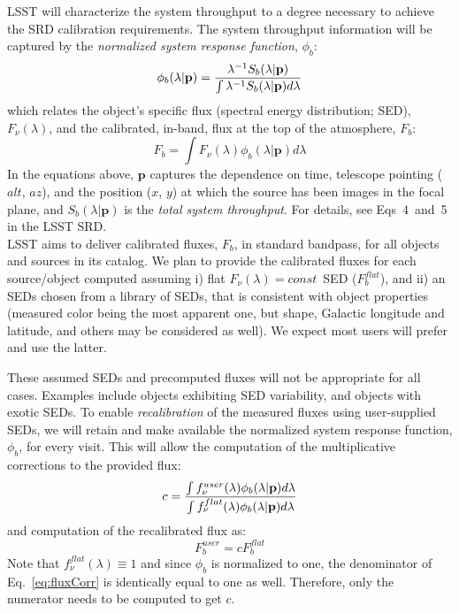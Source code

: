 \documentclass[12pt,preprint]{aastex}
\begin{document}
LSST will characterize the system throughput to a degree necessary to achieve the SRD calibration requirements. The system throughput information will be captured by the {\em normalized system response function}, $\phi_b$:
%
\begin{equation}
    \phi_b(\lambda|\mathbf{p}) = {\lambda^{-1} S_b(\lambda|\mathbf{p}) \over \int \lambda^{-1} S_b(\lambda|\mathbf{p}) d\lambda}
\end{equation}
%
which relates the object's specific flux (spectral energy distribution; SED), $F_\nu(\lambda)$, and the calibrated, in-band, flux at the top of the atmosphere, $F_b$:
%
\begin{equation}
    F_b = \int F_\nu(\lambda) \phi_b(\lambda|\mathbf{p}) d\lambda
\end{equation}
In the equations above, $\mathbf{p}$ captures the dependence on time, telescope pointing ($alt$, $az$), and the position ($x$, $y$) at which the source has been images in the focal plane, and $S_b(\lambda|\mathbf{p})$ is the {\em total system throughput}. For details, see Eqs~4~and~5 in the LSST SRD.
\\

LSST aims to deliver calibrated fluxes, $F_b$, in standard bandpass, for all objects and sources in its catalog. We plan to provide the calibrated fluxes for each source/object computed assuming i) flat $F_\nu(\lambda) = const\,$ SED ($F_b^{flat}$), and ii) an SEDs chosen from a library of SEDs, that is consistent with object properties (measured color being the most apparent one, but shape, Galactic longitude and latitude, and others may be considered as well). We expect most users will prefer and use the latter.

These assumed SEDs and precomputed fluxes will not be appropriate for all cases. Examples include objects exhibiting SED variability, and objects with exotic SEDs. 
To enable {\em recalibration} of the measured fluxes using user-supplied SEDs, we will retain and make available the normalized system response function, $\phi_b$, for every visit. This will allow the computation of the multiplicative corrections to the provided flux:
%
\begin{equation} \label{eq:fluxCorr}
    c = { \int f_\nu^{user}(\lambda) \phi_b(\lambda|\mathbf{p}) d\lambda \over \int f_\nu^{flat}(\lambda) \phi_b(\lambda|\mathbf{p}) d\lambda }
\end{equation}
%
and computation of the recalibrated flux as:
%
\begin{equation}
     F_b^{user} = c F_b^{flat}
\end{equation}
%
Note that $f_\nu^{flat}(\lambda) \equiv 1$ and since $\phi_b$ is normalized to one, the denominator of Eq.~\ref{eq:fluxCorr} is identically equal to one as well. Therefore, only the numerator needs to be computed to get $c$.
\end{document}
